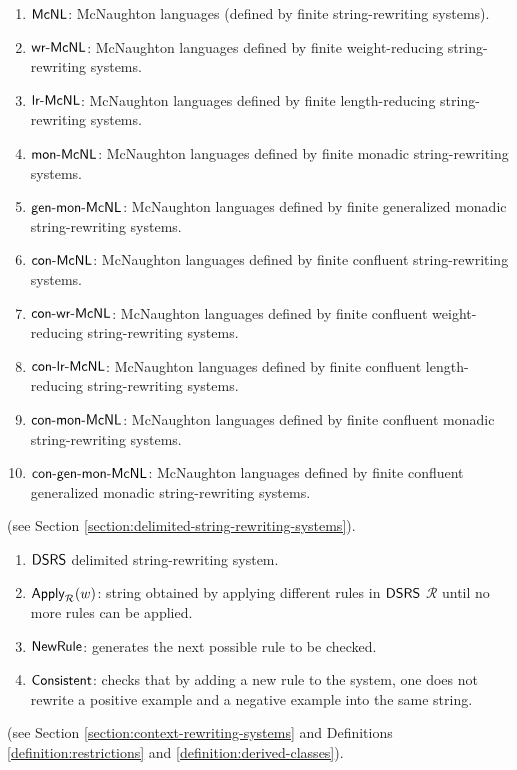 \begin{enumerate}[]
\item ${\sf McNL}$: McNaughton languages (defined by finite string-rewriting systems).
\item $\textup{\sf wr-McNL}$: McNaughton languages defined by finite weight-reducing string-rewriting systems.
\item $\textup{\sf lr-McNL}$: McNaughton languages defined by finite length-reducing string-rewriting systems.
\item $\textup{\sf mon-McNL}$: McNaughton languages defined by finite monadic string-rewriting systems.
\item $\textup{\sf gen-mon-McNL}$: McNaughton languages defined by finite generalized monadic string-rewriting systems.
\item $\textup{\sf con-McNL}$: McNaughton languages defined by finite confluent string-rewriting systems.
\item $\textup{\sf con-wr-McNL}$: McNaughton languages defined by finite confluent weight-reducing string-rewriting systems.
\item $\textup{\sf con-lr-McNL}$: McNaughton languages defined by finite confluent length-reducing string-rewriting systems.
\item $\textup{\sf con-mon-McNL}$: McNaughton languages defined by finite confluent monadic string-rewriting systems.
\item $\textup{\sf con-gen-mon-McNL}$: McNaughton languages defined by finite confluent generalized monadic string-rewriting systems.
\end{enumerate}

 (see Section \ref{section:delimited-string-rewriting-systems}).

\begin{enumerate}[]
\item $\textup{\sf DSRS}$ delimited string-rewriting system.
\item $\textup{\sf Apply}_{\mathcal{R}}(w)$: string obtained by applying different rules in $\textup{\sf DSRS}$ $\mathcal{R}$ until no more rules can be applied.
\item $\textup{\sf NewRule}$: generates the next possible rule to be checked.
\item $\textup{\sf Consistent}$: checks that by adding a new rule to the system, one does not rewrite a positive example and a negative example into the same string.
\end{enumerate}

 (see Section \ref{section:context-rewriting-systems} and Definitions \ref{definition:restrictions} and \ref{definition:derived-classes}).

